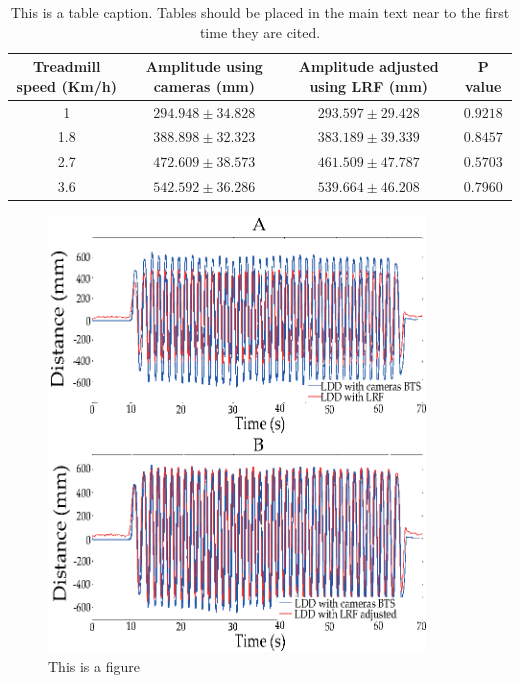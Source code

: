 \documentclass[journal,article,submit,moreauthors,pdftex,10pt,a4paper]{mdpi}
\theoremstyle{mdpi}
\newcounter{ex}
\newcounter{re}
\theoremstyle{mdpidefinition}
\begin{document}
\begin{table}[H]
\caption{This is a table caption. Tables should be placed in the main text near to the first time they are cited.}
\small %
\centering
\begin{tabular}{cccc}
\toprule
\textbf{Treadmill speed (Km/h)}	& \textbf{Amplitude using cameras  (mm)}	& \textbf{Amplitude adjusted using LRF (mm)} & \textbf{P value}\\
\midrule
1 		& $294.948 \pm 34.828$		& $293.597 \pm 29.428$ 	& $0.9218$\\
1.8		& $388.898 \pm 32.323$		& $383.189 \pm 39.339$ 	& $0.8457$\\
2.7 	& $472.609 \pm 38.573$		& $461.509 \pm 47.787$ 	& $0.5703$\\
3.6 	& $542.592 \pm 36.286$		& $539.664 \pm 46.208$ 	& $0.7960$\\

\bottomrule
\end{tabular}
\end{table}


\begin{figure}[H]
\centering
\includegraphics[width=10cm]{LDD_coparation.eps}
\caption{This is a figure}
\end{figure} 
\end{document}
